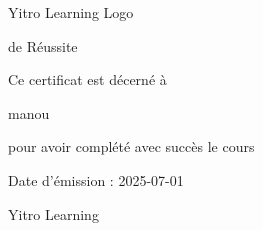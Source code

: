 \documentclass[a4paper]{article}
\begin{document}
\begin{center}
\vspace*{2cm}

{\Large Yitro Learning Logo}

\vspace{1cm}

{\Huge \textbfCertificat de Réussite}

\vspace{1cm}

{\Large Ce certificat est décerné à}

\vspace{0.5cm}

{\Huge manou}

\vspace{0.5cm}

{\Large pour avoir complété avec succès le cours}

\vspace{0.5cm}

{\LARGE \textbfprogrammation}

\vspace{0.5cm}

{\Large Date d'émission : 2025-07-01}

\vspace{1cm}

{\Large Yitro Learning}

\end{center}
\end{document}
